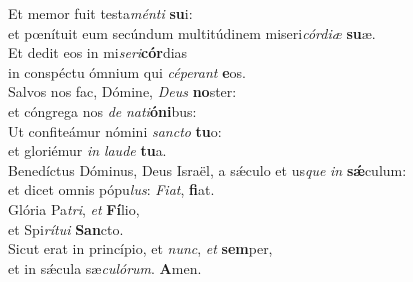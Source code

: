 \oddverse Et memor fuit testa\textit{mén}\textit{ti} \textbf{su}i:~\*\\
\oddverse et pœnítuit eum secúndum multitúdinem miseri\textit{cór}\textit{di}\textit{æ} \textbf{su}æ.\\
\evenverse Et dedit eos in mi\textit{se}\textit{ri}\textbf{cór}dias~\*\\
\evenverse in conspéctu ómnium qui \textit{cé}\textit{pe}\textit{rant} \textbf{e}os.\\
\oddverse Salvos nos fac, Dómine, \textit{De}\textit{us} \textbf{no}ster:~\*\\
\oddverse et cóngrega nos \textit{de} \textit{na}\textit{ti}\textbf{ó}\textbf{ni}bus:\\
\evenverse Ut confiteámur nómini \textit{san}\textit{cto} \textbf{tu}o:~\*\\
\evenverse et gloriémur \textit{in} \textit{lau}\textit{de} \textbf{tu}a.\\
\oddverse Benedíctus Dóminus, Deus Israël, a sǽculo et us\textit{que} \textit{in} \textbf{sǽ}culum:~\*\\
\oddverse et dicet omnis pópu\textit{lus}: \textit{Fi}\textit{at}, \textbf{fi}at.\\
\evenverse Glória Pa\textit{tri}, \textit{et} \textbf{Fí}lio,~\*\\
\evenverse et Spi\textit{rí}\textit{tu}\textit{i} \textbf{San}cto.\\
\oddverse Sicut erat in princípio, et \textit{nunc}, \textit{et} \textbf{sem}per,~\*\\
\oddverse et in sǽcula sæ\textit{cu}\textit{ló}\textit{rum}. \textbf{A}men.\\
